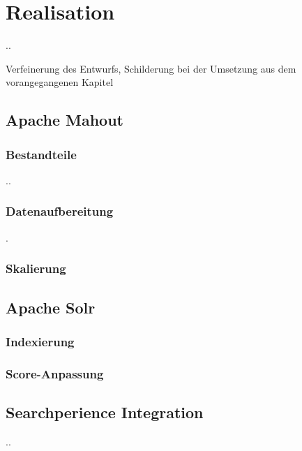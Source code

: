 \section{Realisation}\newpage.\newpage\newpage.\newpage
	
	Verfeinerung des Entwurfs, Schilderung bei der Umsetzung aus dem vorangegangenen Kapitel
	
\subsection{Apache Mahout}
\subsubsection{Bestandteile}.\newpage.\newpage
\subsubsection{Datenaufbereitung}\newpage.\newpage\newpage
\subsubsection{Skalierung}
\subsection{Apache Solr}	\newpage
\subsubsection{Indexierung}
\subsubsection{Score-Anpassung}\newpage
\subsection{Searchperience Integration}	\newpage.\newpage.\newpage
